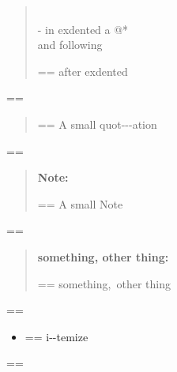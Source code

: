 \documentclass{book}
\makeatletter
\newenvironment{Texinfopreformatted}{%
  \par\GNUTobeylines\obeyspaces\frenchspacing\parskip=\z@\parindent=\z@}{}
{\catcode`\^^M=13 \gdef\GNUTobeylines{\catcode`\^^M=13 \def^^M{\null\par}}}
\newenvironment{Texinfoindented}{\begin{list}{}{}\item\relax}{\end{list}}
\renewcommand{\_}{\Texinfounderscore\discretionary{}{}{}}
\makeatother
\begin{document}
\begin{Texinfoindented}
\begin{quote}
\leavevmode{}\\
\hbox{\kern -\leftmargin}%
in exdented a @* \leavevmode{}\\ and following
\\
\begin{Texinfopreformatted}%
\ttfamily after exdented
\end{Texinfopreformatted}
\end{quote}
\begin{Texinfopreformatted}%
\ttfamily 
\end{Texinfopreformatted}
\begin{quote}
\begin{footnotesize}
\begin{Texinfopreformatted}%
\ttfamily A small quot{-}{-}{-}ation
\end{Texinfopreformatted}
\end{footnotesize}
\end{quote}
\begin{Texinfopreformatted}%
\ttfamily 
\end{Texinfopreformatted}
\begin{quote}
\begin{footnotesize}
\textbf{Note:} \begin{Texinfopreformatted}%
\ttfamily A small Note
\end{Texinfopreformatted}
\end{footnotesize}
\end{quote}
\begin{Texinfopreformatted}%
\ttfamily 
\end{Texinfopreformatted}
\begin{quote}
\begin{footnotesize}
\textbf{something, other thing:} \begin{Texinfopreformatted}%
\ttfamily something,\ other thing
\end{Texinfopreformatted}
\end{footnotesize}
\end{quote}
\begin{Texinfopreformatted}%
\ttfamily 
\end{Texinfopreformatted}
\begin{itemize}
\item \begin{Texinfopreformatted}%
\ttfamily i{-}{-}temize
\end{Texinfopreformatted}
\end{itemize}
\begin{Texinfopreformatted}%

\end{Texinfopreformatted}
\end{Texinfoindented}
\end{document}
